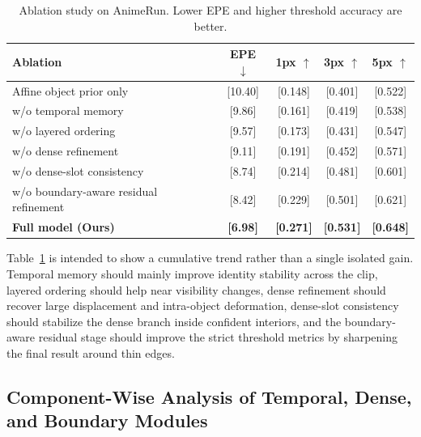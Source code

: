 \begin{table}[t]
\centering
\caption{Ablation study on AnimeRun. Lower EPE and higher threshold accuracy are better.}
\label{tab:ablation_results}
\begin{tabular}{lcccc}
\hline
Ablation & EPE $\downarrow$ & 1px $\uparrow$ & 3px $\uparrow$ & 5px $\uparrow$ \\
\hline
Affine object prior only & [10.40] & [0.148] & [0.401] & [0.522] \\
\quad w/o temporal memory & [9.86] & [0.161] & [0.419] & [0.538] \\
\quad w/o layered ordering & [9.57] & [0.173] & [0.431] & [0.547] \\
\quad w/o dense refinement & [9.11] & [0.191] & [0.452] & [0.571] \\
\quad w/o dense-slot consistency & [8.74] & [0.214] & [0.481] & [0.601] \\
\quad w/o boundary-aware residual refinement & [8.42] & [0.229] & [0.501] & [0.621] \\
\hline
\textbf{Full model (Ours)} & \textbf{[6.98]} & \textbf{[0.271]} & \textbf{[0.531]} & \textbf{[0.648]} \\
\hline
\end{tabular}
\end{table}

Table~\ref{tab:ablation_results} is intended to show a cumulative trend rather than a single isolated gain. Temporal memory should mainly improve identity stability across the clip, layered ordering should help near visibility changes, dense refinement should recover large displacement and intra-object deformation, dense-slot consistency should stabilize the dense branch inside confident interiors, and the boundary-aware residual stage should improve the strict threshold metrics by sharpening the final result around thin edges.

\subsection{Component-Wise Analysis of Temporal, Dense, and Boundary Modules}

